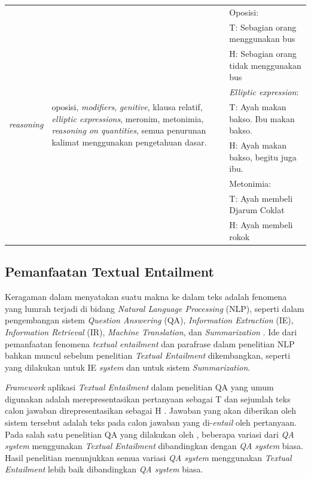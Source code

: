 \begin{table}
\begin{tabular}{|p{2cm}|p{4cm}|p{7cm}|}
			\multirow{9}{*}{\textit{reasoning}} & \multirow{9}{4cm}{oposisi, \textit{modifiers}, \textit{genitive}, klausa relatif, \textit{elliptic expressions}, meronim, metonimia, \textit{reasoning on quantities}, semua penurunan kalimat menggunakan pengetahuan dasar.} & Oposisi: \\
			&  & T: Sebagian orang menggunakan bus \\
			&  & H: Sebagian orang tidak menggunakan bus \\
			&  & \textit{Elliptic expression}: \\
			&  & T: Ayah makan bakso.  Ibu makan bakso. \\
			&  & H: Ayah makan bakso, begitu juga ibu. \\
			&  & Metonimia: \\
			&  & T: Ayah membeli Djarum Coklat \\
			&  & H: Ayah membeli rokok \\ \hline
		\end{tabular}
	\end{table}
	
	\subsection{Pemanfaatan Textual Entailment}
	Keragaman dalam menyatakan suatu makna ke dalam teks adalah fenomena yang lumrah terjadi di bidang \textit{Natural Language Processing} (NLP), seperti dalam pengembangan sistem \textit{Question Answering} (QA), \textit{Information Extraction} (IE), \textit{Information Retrieval} (IR), \textit{Machine Translation}, dan \textit{Summarization} \citep{dagan2004}. Ide dari pemanfaatan fenomena \textit{textual entailment} dan parafrase dalam penelitian NLP bahkan muncul sebelum penelitian \textit{Textual Entailment} dikembangkan, seperti yang dilakukan \cite{shinyama2003paraphrase} untuk IE \textit{system} dan \cite{Radev:2000:CTI:1117736.1117745} untuk sistem \textit{Summarization}. 
	
	\textit{Framework} aplikasi \textit{Textual Entailment} dalam penelitian QA yang umum digunakan adalah merepresentasikan pertanyaan sebagai T dan sejumlah teks calon jawaban direpresentasikan sebagai H \citep{sacaleanu-EtAl:2008:DEMOS}. Jawaban yang akan diberikan oleh sistem tersebut adalah teks pada calon jawaban yang di-\textit{entail} oleh pertanyaan. Pada salah satu penelitian QA yang dilakukan oleh \cite{harabagiu-hickl:2006:COLACL}, beberapa variasi dari \textit{QA system} menggunakan \textit{Textual Entailment} dibandingkan dengan \textit{QA system} biasa. Hasil penelitian menunjukkan semua variasi \textit{QA system} menggunakan \textit{Textual Entailment} lebih baik dibandingkan \textit{QA system} biasa.
	
